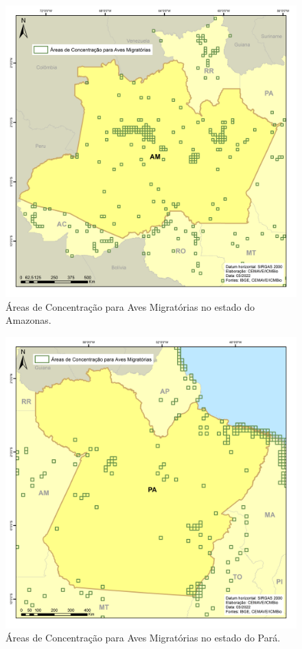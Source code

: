 \documentclass[
  oneside]{scrbook}
\begin{document}
\begin{figure}[H]

{\centering \includegraphics[width=0.75\linewidth]{imagens/cap07/Figura_7.22_AM} 

}

\caption{Áreas de Concentração para Aves Migratórias no estado do Amazonas.}\label{fig:42}
\end{figure}

\begin{figure}[H]

{\centering \includegraphics[width=0.75\linewidth]{imagens/cap07/Figura_7.23_PA} 

}

\caption{Áreas de Concentração para Aves Migratórias no estado do Pará.}\label{fig:43}
\end{figure}
\end{document}
